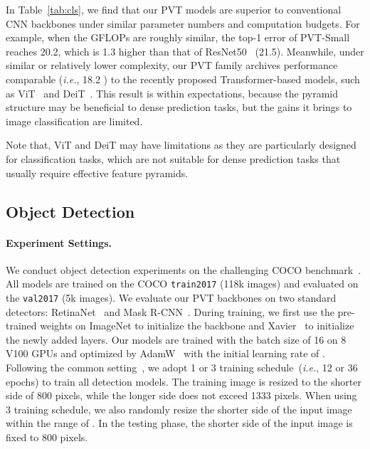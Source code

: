 \documentclass[10pt,twocolumn,letterpaper]{article}
\def\ie{\emph{i.e.}}
\begin{document}
In Table~\ref{tab:cls}, we find that our PVT models are superior to conventional CNN backbones under similar parameter numbers and computation budgets.
For example, when the GFLOPs are roughly similar, the top-1 error of PVT-Small reaches 20.2, which is 1.3 higher than that of ResNet50~\cite{he2016deep} (21.5).
Meanwhile, under similar or relatively lower complexity, our PVT family archives performance comparable (\ie, 18.2 ) to the recently proposed Transformer-based models, such as ViT~\cite{dosovitskiy2020image} and DeiT~\cite{touvron2020training}.
This result is within expectations, because the pyramid structure may be beneficial to dense prediction tasks, but the gains it brings to image classification are limited.

Note that, ViT and DeiT may have limitations as they are particularly designed for classification tasks, which are not suitable for dense prediction tasks that usually require effective feature pyramids.

\subsection{Object Detection}
\label{sec:det}
\paragraph{Experiment Settings.}
We conduct object detection experiments on the challenging COCO benchmark~\cite{lin2014microsoft}.
All models are trained on the COCO \texttt{train2017} (118k images) and evaluated on the \texttt{val2017} (5k images).
We evaluate our PVT backbones on two standard detectors: RetinaNet~\cite{lin2017focal} and Mask R-CNN~\cite{he2017mask}.
During training, we first use the pre-trained weights on ImageNet to initialize the backbone and Xavier~\cite{glorot2010understanding} to initialize the newly added layers.
Our models are trained with the batch size of 16 on 8 V100 GPUs and optimized by AdamW~\cite{loshchilov2017decoupled} with the initial learning rate of .
Following the common setting~\cite{lin2017focal,he2017mask,chen2019mmdetection}, we adopt 1 or 3 training schedule~(\ie, 12 or 36 epochs) to train all detection models.
The training image is resized to the shorter side of 800 pixels, while the longer side does not exceed 1333 pixels.
When using 3 training schedule, we also randomly resize the shorter side of the input image within the range of .
In the testing phase, the shorter side of the input image is fixed to 800 pixels.
\end{document}
